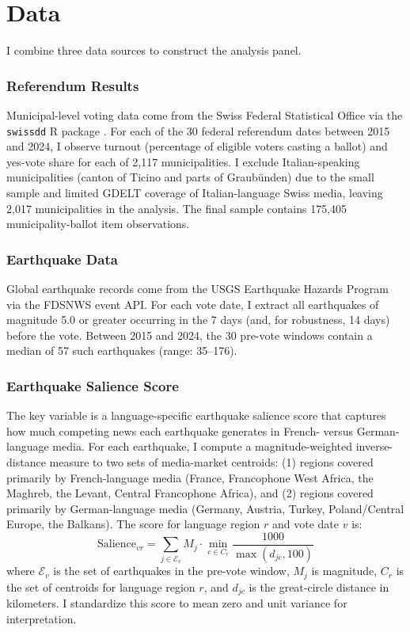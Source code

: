 \documentclass[12pt]{article}
\begin{document}
\section{Data}

I combine three data sources to construct the analysis panel.

\subsubsection*{Referendum Results} Municipal-level voting data come from the Swiss Federal Statistical Office via the \texttt{swissdd} R package \citep{swissdd}. For each of the 30 federal referendum dates between 2015 and 2024, I observe turnout (percentage of eligible voters casting a ballot) and yes-vote share for each of 2,117 municipalities. I exclude Italian-speaking municipalities (canton of Ticino and parts of Graub\"unden) due to the small sample and limited GDELT coverage of Italian-language Swiss media, leaving 2,017 municipalities in the analysis. The final sample contains 175,405 municipality-ballot item observations.

\subsubsection*{Earthquake Data} Global earthquake records come from the USGS Earthquake Hazards Program via the FDSNWS event API. For each vote date, I extract all earthquakes of magnitude 5.0 or greater occurring in the 7 days (and, for robustness, 14 days) before the vote. Between 2015 and 2024, the 30 pre-vote windows contain a median of 57 such earthquakes (range: 35--176).

\subsubsection*{Earthquake Salience Score} The key variable is a language-specific earthquake salience score that captures how much competing news each earthquake generates in French- versus German-language media. For each earthquake, I compute a magnitude-weighted inverse-distance measure to two sets of media-market centroids: (1) regions covered primarily by French-language media (France, Francophone West Africa, the Maghreb, the Levant, Central Francophone Africa), and (2) regions covered primarily by German-language media (Germany, Austria, Turkey, Poland/Central Europe, the Balkans). The score for language region $r$ and vote date $v$ is:
\begin{equation}
\text{Salience}_{vr} = \sum_{j \in \mathcal{E}_v} M_j \cdot \min_{c \in C_r} \frac{1000}{\max(d_{jc}, 100)}
\end{equation}
where $\mathcal{E}_v$ is the set of earthquakes in the pre-vote window, $M_j$ is magnitude, $C_r$ is the set of centroids for language region $r$, and $d_{jc}$ is the great-circle distance in kilometers. I standardize this score to mean zero and unit variance for interpretation.
\end{document}
